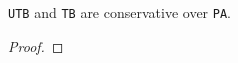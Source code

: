 %

\begin{theorem}
    \label{tb-utb-cons}
    \texttt{UTB} and \texttt{TB} are conservative over \texttt{PA}.
\end{theorem}

\begin{proof} \end{proof}
